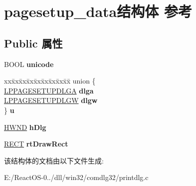 \hypertarget{structpagesetup__data}{}\section{pagesetup\+\_\+data结构体 参考}
\label{structpagesetup__data}
\subsection*{Public 属性}
\begin{DoxyCompactItemize}
\item 
\mbox{\label{structpagesetup__data_a225860942ec939ef710a4d30e9675475}} 
B\+O\+OL {\bfseries unicode}
\item 
\mbox{\label{structpagesetup__data_af8a6d83e876d2b3d1dc4714684d93247}} 
\begin{tabbing}
xx\=xx\=xx\=xx\=xx\=xx\=xx\=xx\=xx\=\kill
union \{\\
\>\hyperlink{structtag_p_s_d_a}{LPPAGESETUPDLGA} {\bfseries dlga}\\
\>\hyperlink{structtag_p_s_d_w}{LPPAGESETUPDLGW} {\bfseries dlgw}\\
\} {\bfseries u}\\

\end{tabbing}\item 
\mbox{\label{structpagesetup__data_a1d5c3c19fa1b6e0237a57dceaff4b2f1}} 
\hyperlink{interfacevoid}{H\+W\+ND} {\bfseries h\+Dlg}
\item 
\mbox{\label{structpagesetup__data_a46ffe82d289fad5ecfb73d30fdc1701a}} 
\hyperlink{structtag_r_e_c_t}{R\+E\+CT} {\bfseries rt\+Draw\+Rect}
\end{DoxyCompactItemize}


该结构体的文档由以下文件生成\+:\begin{DoxyCompactItemize}
\item 
E\+:/\+React\+O\+S-\/0../dll/win32/comdlg32/printdlg.\+c\end{DoxyCompactItemize}
